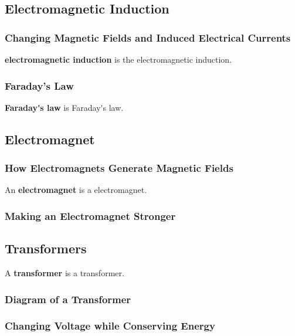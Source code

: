 \documentclass[dvipsnames]{article}
\begin{document}
\subsection{Electromagnetic Induction}

\subsubsection{Changing Magnetic Fields and Induced Electrical Currents}

\textbf{\Gls{electromagnetic induction}} is the \glsdesc{electromagnetic induction}.

\subsubsection{Faraday's Law}

\textbf{\gls{Faraday's law}} is \glsdesc{Faraday's law}.

\clearpage

\subsection{Electromagnet}

\subsubsection{How Electromagnets Generate Magnetic Fields}

An \textbf{\gls{electromagnet}} is a \glsdesc{electromagnet}.

\subsubsection{Making an Electromagnet Stronger}

\subsection{Transformers}

A \textbf{\gls{transformer}} is a \glsdesc{transformer}.

\subsubsection{Diagram of a Transformer}

\subsubsection{Changing Voltage while Conserving Energy}
\end{document}
